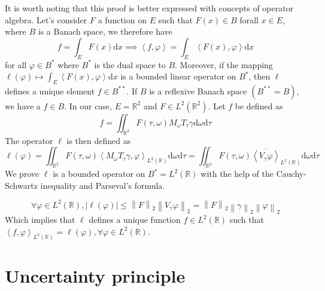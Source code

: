 \documentclass[
  american,
]{article}
\begin{document}
It is worth noting that this proof is better expressed with concepts of operator algebra.
Let's consider \(F\) a function on \(E\) such that \(F(x)\in B\) forall \(x\in E\),
where \(B\) is a Banach space, we therefore have
\begin{equation}
f = \int_E F(x)\mathrm{d}x\implies \left\langle f,\varphi\right\rangle = \int_E \left\langle F(x),\varphi\right\rangle \mathrm{d}x
\end{equation}
for all \(\varphi\in B^*\) where \(B^*\) is the dual space to \(B\).
Moreover, if the mapping \(\ell(\varphi)\mapsto\int_E \left\langle F(x),\varphi\right\rangle\mathrm{d}x\)
is a bounded linear operator on \(B^*\), then \(\ell\) defines a unique element \(f\in B^{**}\).
If \(B\) is a reflexive Banach space \(\left(B^{**}=B\right)\), we have a \(f\in B\).
In our case, \(E=\mathbb{R}^2\) and \(F\in L^2(\mathbb{R}^2)\). Let \(f\) be defined as
\begin{equation}
f = \iint_{\mathbb{R}^2} F(\tau,\omega)M_\omega T_\tau \gamma \mathrm{d}\omega\mathrm{d}\tau
\end{equation}
The operator \(\ell\) is then defined as
\begin{equation}
\ell(\varphi) = \iint_{\mathbb{R}^2} F(\tau,\omega)\left\langle M_\omega T_\tau \gamma,\varphi\right\rangle_{L^2(\mathbb{R})} \mathrm{d}\omega\mathrm{d}\tau
          = \iint_{\mathbb{R}^2} F(\tau,\omega) \overline{\left\langle V_\gamma \varphi\right\rangle}_{L^2(\mathbb{R})} \mathrm{d}\omega\mathrm{d}\tau
\end{equation}
We prove \(\ell\) is a bounded operator on \(B^*=L^2(\mathbb{R})\) with the help
of the Cauchy-Schwartz inequality and Parseval's formula.

\begin{equation}
\forall\varphi\in L^2(\mathbb{R}),\left\lvert\ell(\varphi)\right\rvert \leq \left\lVert F\right\rVert_2 \left\lVert V_\gamma \varphi\right\rVert_2
= \left\lVert F\right\rVert_2 \left\lVert\gamma\right\rVert_2 \left\lVert\varphi\right\rVert_2
\end{equation}
Which implies that \(\ell\) defines a unique function \(f\in L^2(\mathbb{R})\) such that
\(\left\langle f,\varphi\right\rangle_{L^2(\mathbb{R})} = \ell(\varphi),\forall\varphi\in L^2(\mathbb{R})\).

\hypertarget{uncertainty}{%
\section{Uncertainty principle}\label{uncertainty}}
\end{document}
